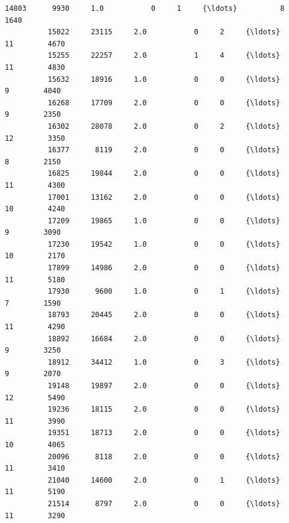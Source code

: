 \documentclass[11pt]{article}
\begin{document}
\begin{Verbatim}[commandchars=\\\{\}]
          14803      9930     1.0           0     1     {\ldots}          8        1640   
          15022     23115     2.0           0     2     {\ldots}         11        4670   
          15255     22257     2.0           1     4     {\ldots}         11        4830   
          15632     18916     1.0           0     0     {\ldots}          9        4040   
          16268     17709     2.0           0     0     {\ldots}          9        2350   
          16302     28078     2.0           0     2     {\ldots}         12        3350   
          16377      8119     2.0           0     0     {\ldots}          8        2150   
          16825     19844     2.0           0     0     {\ldots}         11        4300   
          17001     13162     2.0           0     0     {\ldots}         10        4240   
          17209     19865     1.0           0     0     {\ldots}          9        3090   
          17230     19542     1.0           0     0     {\ldots}         10        2170   
          17899     14986     2.0           0     0     {\ldots}         11        5180   
          17930      9600     1.0           0     1     {\ldots}          7        1590   
          18793     20445     2.0           0     0     {\ldots}         11        4290   
          18892     16684     2.0           0     0     {\ldots}          9        3250   
          18912     34412     1.0           0     3     {\ldots}          9        2070   
          19148     19897     2.0           0     0     {\ldots}         12        5490   
          19236     18115     2.0           0     0     {\ldots}         11        3990   
          19351     18713     2.0           0     0     {\ldots}         10        4065   
          20096      8118     2.0           0     0     {\ldots}         11        3410   
          21040     14600     2.0           0     1     {\ldots}         11        5190   
          21514      8797     2.0           0     0     {\ldots}         11        3290   
          

\end{Verbatim}
\end{document}
